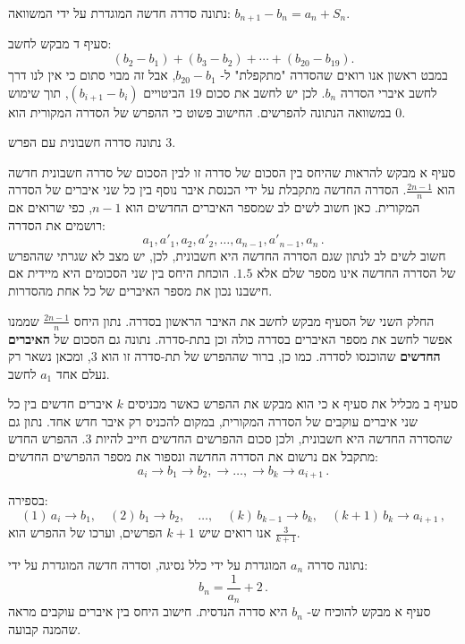 \documentclass[12pt,a4paper]{article}
\begin{document}
נתונה סדרה חדשה המוגדרת על ידי המשוואה:
$b_{n+1}-b_n=a_n+S_n$.

סעיף ד מבקש לחשב:
\[
(b_2-b_1) + (b_3-b_2) + \cdots + (b_{20}-b_{19}).
\]
במבט ראשון אנו רואים שהסדרה "מתקפלת" ל-%
$b_{20}-b_1$,
אבל זה מבוי סתום כי אין לנו דרך לחשב איברי הסדרה
$b_n$.
לכן יש לחשב את סכום
$19$
הביטויים
$(b_{i+1}-b_i)$,
תוך שימוש במשוואה הנתונה להפרשים. החישוב פשוט כי ההפרש של הסדרה המקורית הוא
$0$.

\bigskip

\textbf{}
נתונה סדרה חשבונית עם הפרש
$3$.

סעיף א מבקש להראות שהיחס בין הסכום של סדרה זו לבין הסכום של סדרה חשבונית חדשה הוא 
$\frac{2n-1}{n}$.
הסדרה החדשה מתקבלת על ידי הכנסת איבר נוסף בין כל שני איברים של הסדרה המקורית. כאן חשוב לשים לב שמספר האיברים החדשים הוא
$n-1$,
כפי שרואים אם רושמים את הסדרה:
\[
a_1, a'_1, a_2, a'_2, \ldots, a_{n-1}, a'_{n-1}, a_n\,.
\]
חשוב לשים לב לנתון שגם הסדרה החדשה היא חשבונית, לכן, יש מצב לא שגרתי שההפרש של הסדרה החדשה אינו מספר שלם אלא
$1.5$.
הוכחת היחס בין שני הסכומים היא מיידית אם חישבנו נכון את מספר האיברים של כל אחת מהסדרות.

החלק השני של הסעיף מבקש לחשב את האיבר הראשון בסדרה. נתון היחס 
$\frac{2n-1}{n}$
שממנו אפשר לחשב את מספר האיברים בסדרה כולה וכן בתת-סדרה. נתונה גם הסכום של 
\textbf{האיברים החדשים}
שהוכנסו לסדרה. כמו כן, ברור שההפרש של תת-סדרה זו הוא
$3$,
ומכאן נשאר רק נעלם אחד
$a_1$
לחשב.

סעיף ב מכליל את סעיף א כי הוא מבקש את ההפרש כאשר מכניסים
$k$
איברים חדשים בין כל שני איברים עוקבים של הסדרה המקורית, במקום להכניס רק איבר חדש אחד. נתון גם שהסדרה החדשה היא חשבונית, ולכן סכום ההפרשים החדשים חייב להיות
$3$.
ההפרש החדש מתקבל אם נרשום את הסדרה החדשה ונספור את מספר ההפרשים החדשים:
\[
a_i\rightarrow b_1\rightarrow b_2, \rightarrow \ldots, \rightarrow b_k\rightarrow a_{i+1}\,.
\]

בספירה:
\[
(1)\, a_i\rightarrow b_1,\quad (2)\, b_1 \rightarrow b_2, \quad \ldots, \quad (k)\, b_{k-1} \rightarrow b_k,\quad (k+1)\, b_k\rightarrow a_{i+1}\,,
\]
אנו רואים שיש
$k+1$
הפרשים, וערכו של ההפרש הוא
$\frac{3}{k+1}$.

\bigskip

\textbf{}
נתונה סדרה
$a_n$
המוגדרת על ידי כלל נסיגה, וסדרה חדשה המוגדרת על ידי:
\[
b_n = \frac{1}{a_n} + 2\,.
\]
סעיף א מבקש להוכיח ש-%
$b_n$
היא סדרה הנדסית. חישוב היחס בין איברים עוקבים מראה שהמנה קבועה.
\end{document}
